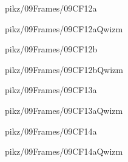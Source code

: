 \documentclass[9pt,xcolor={svgnames, x11names}]{beamer}
\begin{document}

\begin{frame}{pikz/09Frames/09CF12a}
  
\end{frame}


\begin{frame}{pikz/09Frames/09CF12aQwizm}
  
\end{frame}


\begin{frame}{pikz/09Frames/09CF12b}
  
\end{frame}


\begin{frame}{pikz/09Frames/09CF12bQwizm}
  
\end{frame}


\begin{frame}{pikz/09Frames/09CF13a}
  
\end{frame}


\begin{frame}{pikz/09Frames/09CF13aQwizm}
  
\end{frame}


\begin{frame}{pikz/09Frames/09CF14a}
  
\end{frame}


\begin{frame}{pikz/09Frames/09CF14aQwizm}
  
\end{frame}
\end{document}
